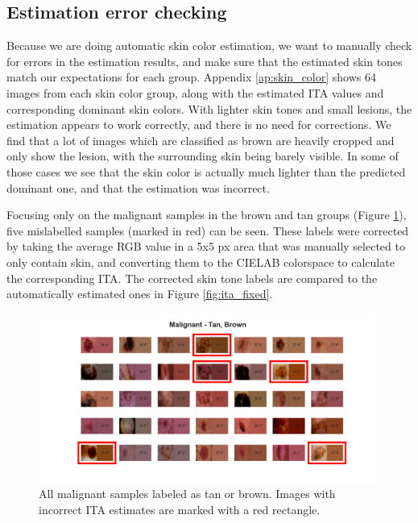 \subsection{Estimation error checking}
Because we are doing automatic skin color estimation, we want to manually check for errors in the estimation results, and make sure that the estimated skin tones match our expectations for each group. Appendix \ref{ap:skin_color} shows 64 images from each skin color group, along with the estimated ITA values and corresponding dominant skin colors. With lighter skin tones and small lesions, the estimation appears to work correctly, and there is no need for corrections. We find that a lot of images which are classified as brown are heavily cropped and only show the lesion, with the surrounding skin being barely visible. In some of those cases we see that the skin color is actually much lighter than the predicted dominant one, and that the estimation was incorrect. 

Focusing only on the malignant samples in the brown and tan groups (Figure \ref{fig:ita_errors}), five mislabelled samples (marked in red) can be seen. These labels were corrected by taking the average RGB value in a 5x5 px area that was manually selected to only contain skin, and converting them to the CIELAB colorspace to calculate the corresponding ITA. The corrected skin tone labels are compared to the automatically estimated ones in Figure \ref{fig:ita_fixed}.

\begin{figure}[htpb]
     \centering
     \includegraphics[width=0.99\textwidth]{figures/eda/Malignant, Tan_Brown, errors.png}
     \caption{All malignant samples labeled as tan or brown. Images with incorrect ITA estimates are marked with a red rectangle.}
     \label{fig:ita_errors}
\end{figure}

